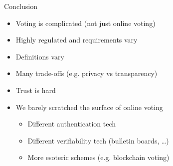 \begin{frame}{Conclusion}
  \begin{itemize}[<+(1)->]
    \item Voting is complicated (not just online voting)
    \item Highly regulated and requirements vary
    \item Definitions vary
    \item Many trade-offs (e.g. privacy vs transparency)
    \item Trust is hard
    \item We barely scratched the surface of online voting
    \par
    \begin{itemize}
      \item Different authentication tech
      \item Different verifiability tech (bulletin boards, \dots)
      \item More esoteric schemes (e.g. blockchain voting)
    \end{itemize}
  \end{itemize}
\end{frame}


